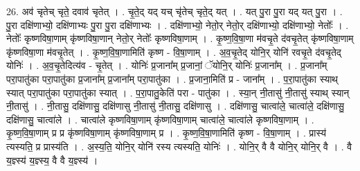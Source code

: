 \documentclass[17pt]{extarticle}
\begin{document}
26. अव॑ चृतेच् चृते॒ दवाव॑ चृतेत् । . चृ॒ते॒द् यद् यच् चृ॑तेच् चृते॒द् यत् । . यत् पु॒रा पु॒रा यद् यत् पु॒रा । . पु॒रा दक्षि॑णाभ्यो॒ दक्षि॑णाभ्यः पु॒रा पु॒रा दक्षि॑णाभ्यः । . दक्षि॑णाभ्यो॒ नेतो॒र् नेतो॒र् दक्षि॑णाभ्यो॒ दक्षि॑णाभ्यो॒ नेतोः᳚ । . नेतोः᳚ कृष्णविषा॒णाम् कृ॑ष्णविषा॒णान् नेतो॒र् नेतोः᳚ कृष्णविषा॒णाम् । . कृ॒ष्ण॒वि॒षा॒णा म॑वचृ॒ते द॑वचृ॒तेत् कृ॑ष्णविषा॒णाम् कृ॑ष्णविषा॒णा म॑वचृ॒तेत् । . कृ॒ष्ण॒वि॒षा॒णामिति॑ कृष्ण - वि॒षा॒णाम् । . अ॒व॒चृ॒तेद् योनि॒र् योनि॑ रवचृ॒ते द॑वचृ॒तेद् योनिः॑ । . अ॒व॒चृ॒तेदित्य॑व - चृ॒तेत् । . योनिः॑ प्र॒जाना᳚म् प्र॒जानां॒ ॅयोनि॒र् योनिः॑ प्र॒जाना᳚म् । . प्र॒जाना᳚म् परा॒पातु॑का परा॒पातु॑का प्र॒जाना᳚म् प्र॒जाना᳚म् परा॒पातु॑का । . प्र॒जाना॒मिति॑ प्र - जाना᳚म् । . प॒रा॒पातु॑का स्याथ् स्यात् परा॒पातु॑का परा॒पातु॑का स्यात् । . प॒रा॒पातु॒केति॑ परा - पातु॑का । . स्या॒न् नी॒तासु॑ नी॒तासु॑ स्याथ् स्यान् नी॒तासु॑ । . नी॒तासु॒ दक्षि॑णासु॒ दक्षि॑णासु नी॒तासु॑ नी॒तासु॒ दक्षि॑णासु । . दक्षि॑णासु॒ चात्वा॑ले॒ चात्वा॑ले॒ दक्षि॑णासु॒ दक्षि॑णासु॒ चात्वा॑ले । . चात्वा॑ले कृष्णविषा॒णाम् कृ॑ष्णविषा॒णाम् चात्वा॑ले॒ चात्वा॑ले कृष्णविषा॒णाम् । . कृ॒ष्ण॒वि॒षा॒णाम् प्र प्र कृ॑ष्णविषा॒णाम् कृ॑ष्णविषा॒णाम् प्र । . कृ॒ष्ण॒वि॒षा॒णामिति॑ कृष्ण - वि॒षा॒णाम् । . प्रास्य॑ त्यस्यति॒ प्र प्रास्य॑ति । . अ॒स्य॒ति॒ योनि॒र् योनि॑ रस्य त्यस्यति॒ योनिः॑ । . योनि॒र् वै वै योनि॒र् योनि॒र् वै । . वै य॒ज्ञ्स्य॑ य॒ज्ञ्स्य॒ वै वै य॒ज्ञ्स्य॑ । \newline
\end{document}
